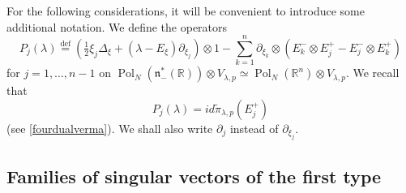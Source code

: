 \documentclass[a4paper,12pt,reqno]{amsart}
\numberwithin{theorem}{subsection}
\numberwithin{equation}{section}
\begin{document}
For the following considerations, it will be convenient to introduce some
additional notation. We define the operators
\begin{equation}\label{P-operator}
   P_j(\lambda) {\stackrel{\text{def}}{=}} (\tfrac{1}{2} \xi_j \Delta_\xi + (\lambda - E_\xi)\partial_{\xi_j}) \otimes 1
   - \sum_{k=1}^{n} \partial_{\xi_k} \otimes (E_k^- \otimes E_j^+ - E_j^- \otimes E_k^+)
\end{equation}
for $j=1,\dots,n-1$ on ${\operatorname{Pol}}_N({{\mathfrak n}}_-^*({\mathbb{R}})) \otimes V_{\lambda,p} \simeq
{\operatorname{Pol}}_N({\mathbb{R}}^n) \otimes V_{\lambda,p}$. We recall that
$$
   P_j(\lambda) = i {d} \tilde{\pi}_{\lambda,p}(E_j^+)
$$
(see \eqref{fourdualverma}). We shall also write $\partial_j$ instead of
$\partial_{\xi_j}$.

\subsection{Families of singular vectors of the first type}\label{sv-type1}
\end{document}
